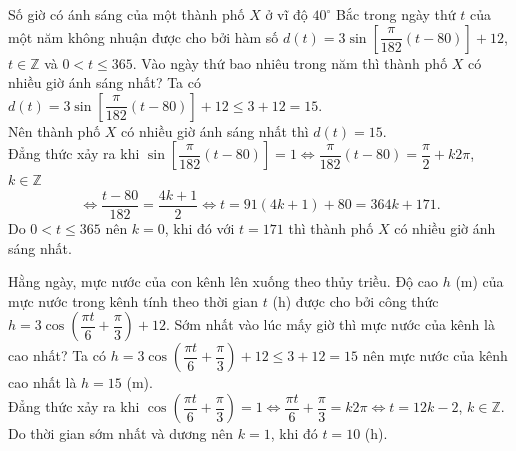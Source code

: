 \begin{ex}%
	[Mức độ 3]
	Số giờ có ánh sáng của một thành phố $X$ ở vĩ độ $40^\circ$ Bắc trong ngày thứ $t$ của một năm không nhuận được cho bởi hàm số $d(t)=3\sin\left[\dfrac{\pi}{182}(t-80)\right]+12$, $t\in\mathbb{Z}$ và $0<t\le 365$. Vào ngày thứ bao nhiêu trong năm thì thành phố $X$ có nhiều giờ ánh sáng nhất?
	\loigiai
	{
		Ta có $d(t)=3\sin\left[\dfrac{\pi}{182}(t-80)\right]+12\le 3+12=15$.\\
		Nên thành phố $X$ có nhiều giờ ánh sáng nhất thì $d(t)=15$.\\
		Đẳng thức xảy ra khi $\sin\left[\dfrac{\pi}{182}(t-80)\right]=1\Leftrightarrow \dfrac{\pi}{182}(t-80)=\dfrac{\pi}{2}+k2\pi$, $k\in\mathbb{Z}$
		\[\Leftrightarrow \dfrac{t-80}{182}=\dfrac{4k+1}{2}\Leftrightarrow t=91(4k+1)+80=364k+171.\]
		Do $0<t\le 365$ nên $k=0$, khi đó với $t=171$ thì thành phố $X$ có nhiều giờ ánh sáng nhất.
	}
\end{ex}

\begin{ex}%
	[Mức độ 3]
	Hằng ngày, mực nước của con kênh lên xuống theo thủy triều. Độ cao $h$ (m) của mực nước trong kênh tính theo thời gian $t$ (h) được cho bởi công thức $h=3\cos\left(\dfrac{\pi t}{6}+\dfrac{\pi}{3}\right)+12$. Sớm nhất vào lúc mấy giờ thì mực nước của kênh là cao nhất?
	\loigiai
	{
		Ta có $h=3\cos\left(\dfrac{\pi t}{6}+\dfrac{\pi}{3}\right)+12\le 3+12=15$ nên mực nước của kênh cao nhất là $h=15$ (m).\\
		Đẳng thức xảy ra khi $\cos\left(\dfrac{\pi t}{6}+\dfrac{\pi}{3}\right)=1\Leftrightarrow \dfrac{\pi t}{6}+\dfrac{\pi}{3}=k2\pi\Leftrightarrow t=12k-2$, $k\in\mathbb{Z}$.\\
		Do thời gian sớm nhất và dương nên $k=1$, khi đó $t=10$ (h).
	}
\end{ex}

